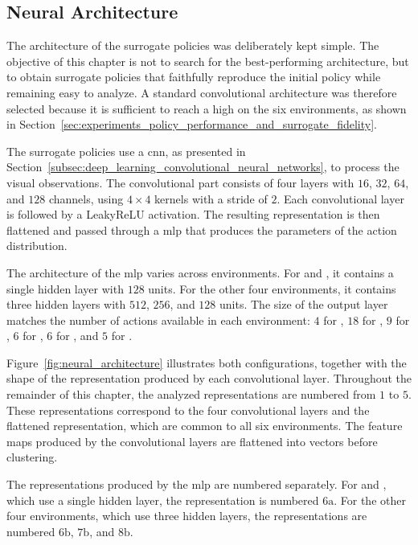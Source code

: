 \subsection{Neural Architecture}

The architecture of the surrogate policies was deliberately kept simple.
The objective of this chapter is not to search for the best-performing architecture, but to obtain surrogate policies that faithfully reproduce the initial policy while remaining easy to analyze.
A standard convolutional architecture was therefore selected because it is sufficient to reach a high \BehaviorReconstructionName on the six environments, as shown in Section~\ref{sec:experiments_policy_performance_and_surrogate_fidelity}.

The surrogate policies use a \gls{cnn}, as presented in Section~\ref{subsec:deep_learning_convolutional_neural_networks}, to process the visual observations.
The convolutional part consists of four layers with $16$, $32$, $64$, and $128$ channels, using $4 \times 4$ kernels with a stride of $2$.
Each convolutional layer is followed by a LeakyReLU activation.
The resulting representation is then flattened and passed through a \gls{mlp} that produces the parameters of the action distribution.

The architecture of the \gls{mlp} varies across environments.
For \PongName and \SpaceInvadersName, it contains a single hidden layer with $128$ units.
For the other four environments, it contains three hidden layers with $512$, $256$, and $128$ units.
The size of the output layer matches the number of actions available in each environment: $4$ for \BreakoutName, $18$ for \MarioBrosName, $9$ for \MsPacManName, $6$ for \PongName, $6$ for \SpaceInvadersName, and $5$ for \SurroundName.

Figure~\ref{fig:neural_architecture} illustrates both configurations, together with the shape of the representation produced by each convolutional layer.
Throughout the remainder of this chapter, the analyzed representations are numbered from $1$ to $5$.
These representations correspond to the four convolutional layers and the flattened representation, which are common to all six environments.
The feature maps produced by the convolutional layers are flattened into vectors before clustering.

The representations produced by the \gls{mlp} are numbered separately.
For \PongName and \SpaceInvadersName, which use a single hidden layer, the representation is numbered $6\text{a}$.
For the other four environments, which use three hidden layers, the representations are numbered $6\text{b}$, $7\text{b}$, and $8\text{b}$.

